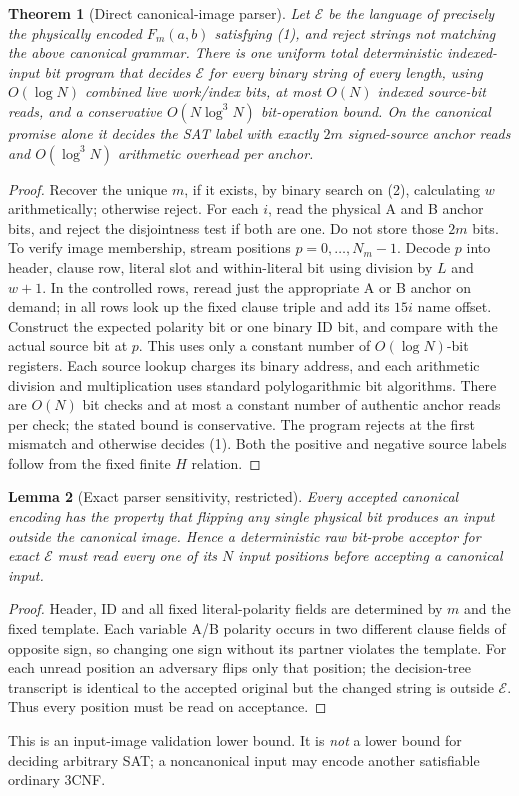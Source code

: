 \documentclass[11pt]{article}
\newtheorem{theorem}{Theorem}
\newtheorem{lemma}[theorem]{Lemma}
\begin{document}
\begin{theorem}[Direct canonical-image parser]
Let $\mathcal E$ be the language of precisely the
physically encoded $F_m(a,b)$ satisfying (1), and reject
strings not matching the above canonical grammar.
There is one uniform total deterministic indexed-input
bit program that decides $\mathcal E$ for every binary
string of every length, using $O(\log N)$ combined live
work/index bits, at most $O(N)$ indexed source-bit reads,
and a conservative $O(N\log^3N)$ bit-operation bound.
On the \emph{canonical promise} alone it decides the
SAT label with exactly $2m$ signed-source anchor reads
and $O(\log^3N)$ arithmetic overhead per anchor.
\end{theorem}
\begin{proof}
Recover the unique $m$, if it exists, by binary search on
(2), calculating $w$ arithmetically; otherwise reject.
For each $i$, read the physical A and B anchor bits,
and reject the disjointness test if both are one.  Do not
store those $2m$ bits.  To verify image membership,
stream positions $p=0,\ldots,N_m-1$. Decode $p$ into
header, clause row, literal slot and within-literal bit
using division by $L$ and $w+1$. In the controlled
rows, reread just the appropriate A or B anchor on
demand; in all rows look up the fixed clause triple
and add its $15i$ name offset. Construct the expected
polarity bit or one binary ID bit, and compare with the
actual source bit at $p$. This uses only a constant
number of $O(\log N)$-bit registers. Each source lookup
charges its binary address, and each arithmetic
division and multiplication uses standard polylogarithmic
bit algorithms. There are $O(N)$ bit checks and at
most a constant number of authentic anchor reads per
check; the stated bound is conservative. The program
rejects at the first mismatch and otherwise decides
(1). Both the positive and negative source labels
follow from the fixed finite $H$ relation.
\end{proof}

\begin{lemma}[Exact parser sensitivity, restricted]
Every accepted canonical encoding has the property that
flipping any \emph{single} physical bit produces an
input outside the canonical image. Hence a deterministic
raw bit-probe acceptor for exact $\mathcal E$
must read every one of its $N$ input positions before
accepting a canonical input.
\end{lemma}
\begin{proof}
Header, ID and all fixed literal-polarity fields are
determined by $m$ and the fixed template. Each variable
A/B polarity occurs in two different clause fields
of opposite sign, so changing one sign without its
partner violates the template. For each unread position
an adversary flips only that position; the decision-tree
transcript is identical to the accepted original
but the changed string is outside $\mathcal E$.
Thus every position must be read on acceptance.
\end{proof}
This is an input-image validation lower bound. It is
\emph{not} a lower bound for deciding arbitrary SAT;
a noncanonical input may encode another satisfiable
ordinary 3CNF.
\end{document}

